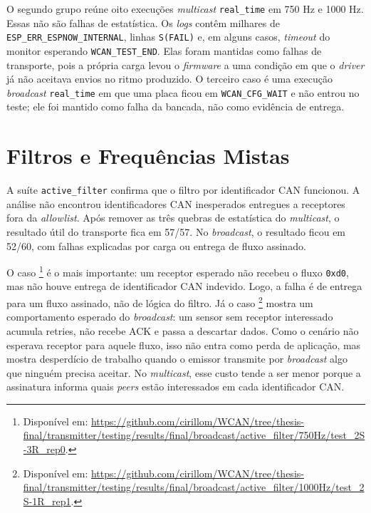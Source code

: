 O segundo grupo reúne oito execuções \emph{multicast} \texttt{real\_time} em 750 Hz e
1000 Hz. Essas não são falhas de estatística. Os \emph{logs} contêm milhares de
\texttt{ESP\_ERR\_ESPNOW\_INTERNAL}, linhas \texttt{S(FAIL)} e, em alguns casos,
\emph{timeout} do monitor esperando \texttt{WCAN\_TEST\_END}. Elas foram mantidas como
falhas de transporte, pois a própria carga levou o \emph{firmware} a uma condição em
que o \emph{driver} já não aceitava envios no ritmo produzido. O terceiro caso é uma
execução \emph{broadcast} \texttt{real\_time} em que uma placa ficou em
\texttt{WCAN\_CFG\_WAIT} e não entrou no teste; ele foi mantido como falha da
bancada, não como evidência de entrega.

\section{Filtros e Frequências Mistas}

A suíte \texttt{active\_filter} confirma que o filtro por identificador CAN funcionou. A
análise não encontrou identificadores CAN inesperados entregues a receptores fora da
\emph{allowlist}. Após remover as três quebras de estatística do \emph{multicast}, o
resultado útil do transporte fica em 57/57. No \emph{broadcast}, o resultado ficou em
52/60, com falhas explicadas por carga ou entrega de fluxo assinado.

O caso \footnote{Disponível em: \url{https://github.com/cirillom/WCAN/tree/thesis-final/transmitter/testing/results/final/broadcast/active_filter/750Hz/test_2S-3R_rep0}.} é o mais importante:
um receptor esperado não recebeu o fluxo \texttt{0xd0}, mas não houve entrega de
identificador CAN indevido. Logo, a falha é de entrega para um fluxo assinado, não de lógica
do filtro. Já o caso \footnote{Disponível em: \url{https://github.com/cirillom/WCAN/tree/thesis-final/transmitter/testing/results/final/broadcast/active_filter/1000Hz/test_2S-1R_rep1}.}
mostra um comportamento esperado do \emph{broadcast}: um sensor sem receptor interessado
acumula retries, não recebe ACK e passa a descartar dados. Como o cenário não
esperava receptor para aquele fluxo, isso não entra como perda de aplicação, mas
mostra desperdício de trabalho quando o emissor transmite por \emph{broadcast} algo que
ninguém precisa aceitar. No \emph{multicast}, esse custo tende a ser menor porque a
assinatura informa quais \emph{peers} estão interessados em cada identificador CAN.

